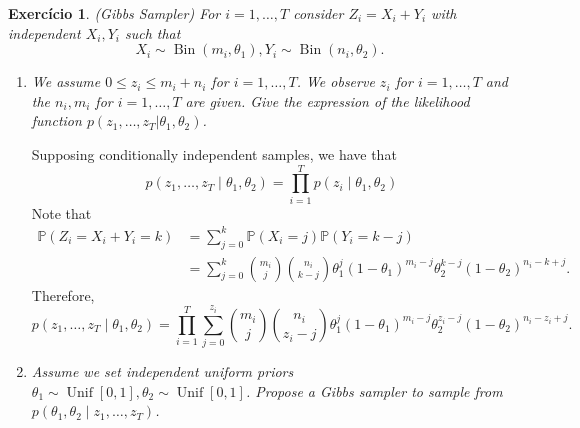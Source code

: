 \documentclass[a4paper,12pt]{article}
\newcommand{\unif}{\operatorname{Unif}}
\newcommand{\bin}{\operatorname{Bin}}
\newcommand{\pr}{\mathbb{P}}
\newtheorem{exercise}{Exercício}
\theoremstyle{definition}
\begin{document}
\begin{exercise}
    (Gibbs Sampler)
    For $i = 1, \dots , T$ consider $Z_i = X_i + Y_i$ with independent $X_i,
    Y_i$ such that
    $$
    X_i \sim \bin(m_i , \theta_1), Y_i \sim \bin(n_i, \theta_2).
    $$
\end{exercise}

\begin{enumerate}
    \item {\it We assume $0 \le z_i \le m_i + n_i$ for $i = 1, \dots , T$. We
    observe $z_i$ for $i = 1,\dots, T$ and the $n_i , m_i$ for
    $i = 1, \dots, T$ are given. Give the expression of the likelihood
    function $p(z_1, \dots, z_T| \theta_1, \theta_2)$.}
    
    Supposing conditionally independent samples, we have that 
    $$
    p(z_1, \dots, z_T \mid \theta_1, \theta_2) = \prod_{i=1}^T p(z_i\mid \theta_1, \theta_2)
    $$
    Note that 
    \begin{equation*}
        \begin{split}
            \pr(Z_i = X_i + Y_i = k) &= \sum_{j=0}^k \pr(X_i = j)\pr(Y_i = k-j) \\
            &= \sum_{j=0}^k \binom{m_i}{j}\binom{n_i}{k-j}\theta_1^j(1-\theta_1)^{m_i - j}\theta_2^{k-j}(1 - \theta_2)^{n_i - k + j}. 
        \end{split}
    \end{equation*}
    Therefore, 
    $$
    p(z_1, \dots, z_T \mid \theta_1, \theta_2) = \prod_{i=1}^T \sum_{j=0}^{z_i} \binom{m_i}{j}\binom{n_i}{z_i-j}\theta_1^j(1-\theta_1)^{m_i - j}\theta_2^{z_i-j}(1 - \theta_2)^{n_i - z_i + j}.
    $$

    \item {\it Assume we set independent uniform priors $\theta_1 \sim
    \unif[0,1], \theta_2 \sim \unif[0,1]$. Propose a Gibbs sampler to sample from $p( \theta_1 , \theta_2 \mid z_1 , \dots, z_T)$.}
    

\end{enumerate}
\end{document}
